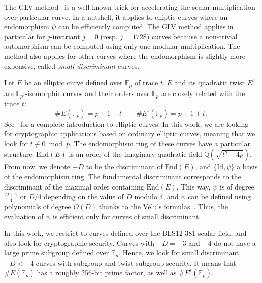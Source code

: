 \documentclass{article}
\newcommand{\Q}{\ensuremath{\mathbb Q}}
\newcommand{\Z}{\ensuremath{\mathbb Z}}
\newcommand{\Fp}{\ensuremath{\mathbb F_p}}
\newcommand{\End}{\ensuremath{\text{End}}}
\theoremstyle{definition}
\begin{document}
The GLV method~\cite{C:GalLamVan01} is a well known trick for accelerating the
scalar multiplication over particular curve. In a nutshell, it applies
to elliptic curves where an endomorphism $\psi$ can be efficiently computed.
The GLV method applies in particular for $j$-invariant $j=0$
(resp. $j=1728$) curves because a non-trivial automorphism can be
computed using only one modular multiplication. %
The method also applies for other curves where the endomorphism is
slightly more expensive, called \emph{small discriminant} curves.

Let $E$ be an elliptic curve defined over $\Fp$ of trace $t$. $E$ and
its quadratic twist $E^t$ are $\mathbb F_{p^2}$-isomorphic curves and
their orders over $\Fp$ are closely related with the trace
$t$:
$$\#E(\Fp) = p+1-t\qquad \#E^t(\Fp) = p+1+t.$$
See~\cite{Silverman86} for a complete introduction to elliptic curves.
In this work, we are looking for cryptographic applications based on
ordinary elliptic curves, meaning that we look for $t\not\equiv 0
\bmod p$. The endomorphism ring of these curves have a particular
structure: $\End(E)$ is an order of the imaginary quadratic field
$\Q(\sqrt{t^2-4p})$.
From now, we denote $-D$ to be the discriminant of $\End(E)$, and
$\{\text{Id},\psi\}$ a basis of the endomorphism ring.
The fundamental discriminant corresponds to the discriminant of the
maximal order containing $\End(E)$.
This way, $\psi$ is of degree $\frac{D+1}4$ or $D/4$ depending on the
value of $D$ modulo $4$, and $\psi$ can be defined using polynomials
of degree $O(D)$ thanks to the Vélu's formulas~\cite{velu71}.
Thus, the evaluation of $\psi$ is efficient only for curves of small
discriminant.


In this work, we restrict to curves defined over the BLS12-381 scalar
field, and also look for cryptographic security. Curves with $-D=-3$
and $-4$ do not have a large prime subgroup defined over $\Fp$. Hence,
we look for small discriminant $-D<-4$ curves with subgroup and
twist-subgroup security. It means that $\#E(\Fp)$ has a roughly 256-bit
prime factor, as well as $\#E^t(\Fp)$.
\end{document}
